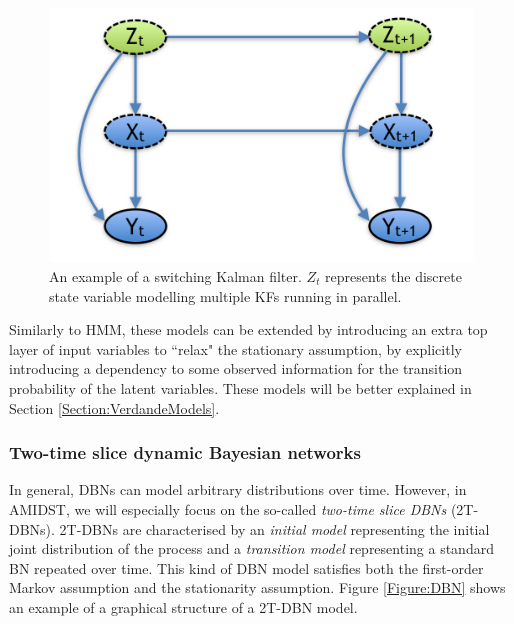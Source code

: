 \begin{figure}[ht!]
\begin{center}
\includegraphics[scale=0.4]{./figures/PreliminariesSKF}
\caption{\label{Figure:SKF} An example of a switching Kalman filter. $Z_t$ represents the discrete state variable modelling multiple KFs running in parallel.}
\end{center}
\end{figure}

Similarly to HMM, these models can be extended by introducing an extra top layer of input variables to ``relax" the stationary assumption, by explicitly introducing a dependency to some observed information for the transition probability of the latent variables. These models will be better explained in Section \ref{Section:VerdandeModels}.

\subsubsection{Two-time slice dynamic Bayesian networks}\label{SubSubSection:2DBNs}	

In general, DBNs can model arbitrary distributions over time. However, in AMIDST,  we will especially focus on the so-called \textit{two-time slice DBNs} (2T-DBNs). 2T-DBNs are characterised by an \textit{initial model} representing the initial joint distribution of the process and a \textit{transition model} representing a standard BN repeated over time. This kind of DBN model satisfies both the first-order Markov assumption and the stationarity assumption. Figure \ref{Figure:DBN} shows an example of a graphical structure of a 2T-DBN model. 

